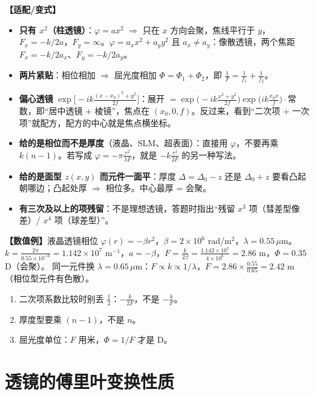 \textbf{【适配/变式】}
\begin{itemize}
\item \textbf{只有 $x^2$（柱透镜）}：$\varphi=ax^2$ $\Rightarrow$ 只在 $x$ 方向会聚，焦线平行于 $y$，$F_x=-k/2a$，$F_y=\infty$。$\varphi=a_xx^2+a_yy^2$ 且 $a_x\neq a_y$：像散透镜，两个焦距 $F_x=-k/2a_x$、$F_y=-k/2a_y$。
\item \textbf{两片紧贴}：相位相加 $\Rightarrow$ 屈光度相加 $\Phi=\Phi_1+\Phi_2$，即 $\frac1F=\frac1{f_1}+\frac1{f_2}$。
\item \textbf{偏心透镜} $\exp\!\big[-ik\frac{(x-x_0)^2+y^2}{2f}\big]$：展开 $=\exp\!\big(-ik\frac{x^2+y^2}{2f}\big)\exp\!\big(ik\frac{x_0x}{f}\big)\cdot$常数，即“居中透镜 + 棱镜”，焦点在 $(x_0,0,f)$。反过来，看到“二次项 + 一次项”就配方，配方的中心就是焦点横坐标。
\item \textbf{给的是相位而不是厚度}（液晶、SLM、超表面）：直接用 $\varphi$，不要再乘 $k(n-1)$。若写成 $\varphi=-\pi\frac{r^2}{\lambda F}$，就是 $-k\frac{r^2}{2F}$ 的另一种写法。
\item \textbf{给的是面型 $z(x,y)$ 而元件一面平}：厚度 $\Delta=\Delta_0-z$ 还是 $\Delta_0+z$ 要看凸起朝哪边；凸起处厚 $\Rightarrow$ 相位多。中心最厚 = 会聚。
\item \textbf{有三次及以上的项残留}：不是理想透镜，答题时指出“残留 $x^3$ 项（彗差型像差）/ $x^4$ 项（球差型）”。
\end{itemize}

\textbf{【数值例】}液晶透镜相位 $\varphi(r)=-\beta r^2$，$\beta=2\times10^{6}$ rad/m$^2$，$\lambda=0.55\,\mu$m。
$k=\frac{2\pi}{0.55\times10^{-6}}=1.142\times10^{7}$ m$^{-1}$，$a=-\beta$，$F=\frac{k}{2\beta}=\frac{1.142\times10^7}{4\times10^6}=2.86$ m，$\Phi=0.35$ D（会聚）。
同一元件换 $\lambda=0.65\,\mu$m：$F\propto k\propto1/\lambda$，$F=2.86\times\frac{0.55}{0.65}=2.42$ m（相位型元件有色散）。

\begin{warn}[等效透镜易错]
\begin{enumerate}
\item 二次项系数比较时别丢 $\frac12$：$-\frac{k}{2F}$，不是 $-\frac kF$。
\item 厚度型要乘 $(n-1)$，不是 $n$。
\item 屈光度单位：$F$ 用米，$\Phi=1/F$ 才是 D。
\end{enumerate}
\end{warn}

\section{透镜的傅里叶变换性质}\label{sec:lensFT}

